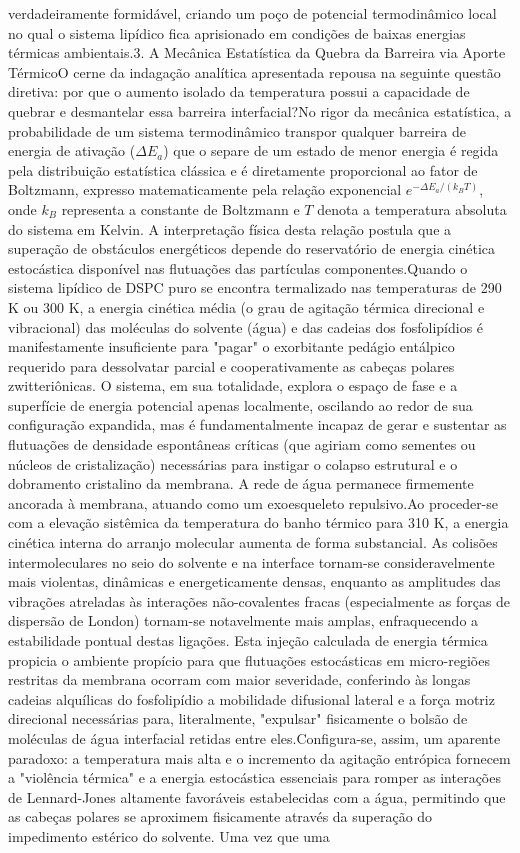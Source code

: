 verdadeiramente formidável, criando um poço de potencial termodinâmico local no qual o sistema lipídico fica aprisionado em condições de baixas energias térmicas ambientais.3. A Mecânica Estatística da Quebra da Barreira via Aporte TérmicoO cerne da indagação analítica apresentada repousa na seguinte questão diretiva: por que o aumento isolado da temperatura possui a capacidade de quebrar e desmantelar essa barreira interfacial?No rigor da mecânica estatística, a probabilidade de um sistema termodinâmico transpor qualquer barreira de energia de ativação ($\Delta E_a$) que o separe de um estado de menor energia é regida pela distribuição estatística clássica e é diretamente proporcional ao fator de Boltzmann, expresso matematicamente pela relação exponencial $e^{-\Delta E_a / (k_B T)}$, onde $k_B$ representa a constante de Boltzmann e $T$ denota a temperatura absoluta do sistema em Kelvin. A interpretação física desta relação postula que a superação de obstáculos energéticos depende do reservatório de energia cinética estocástica disponível nas flutuações das partículas componentes.Quando o sistema lipídico de DSPC puro se encontra termalizado nas temperaturas de 290 K ou 300 K, a energia cinética média (o grau de agitação térmica direcional e vibracional) das moléculas do solvente (água) e das cadeias dos fosfolipídios é manifestamente insuficiente para "pagar" o exorbitante pedágio entálpico requerido para dessolvatar parcial e cooperativamente as cabeças polares zwitteriônicas. O sistema, em sua totalidade, explora o espaço de fase e a superfície de energia potencial apenas localmente, oscilando ao redor de sua configuração expandida, mas é fundamentalmente incapaz de gerar e sustentar as flutuações de densidade espontâneas críticas (que agiriam como sementes ou núcleos de cristalização) necessárias para instigar o colapso estrutural e o dobramento cristalino da membrana. A rede de água permanece firmemente ancorada à membrana, atuando como um exoesqueleto repulsivo.Ao proceder-se com a elevação sistêmica da temperatura do banho térmico para 310 K, a energia cinética interna do arranjo molecular aumenta de forma substancial. As colisões intermoleculares no seio do solvente e na interface tornam-se consideravelmente mais violentas, dinâmicas e energeticamente densas, enquanto as amplitudes das vibrações atreladas às interações não-covalentes fracas (especialmente as forças de dispersão de London) tornam-se notavelmente mais amplas, enfraquecendo a estabilidade pontual destas ligações. Esta injeção calculada de energia térmica propicia o ambiente propício para que flutuações estocásticas em micro-regiões restritas da membrana ocorram com maior severidade, conferindo às longas cadeias alquílicas do fosfolipídio a mobilidade difusional lateral e a força motriz direcional necessárias para, literalmente, "expulsar" fisicamente o bolsão de moléculas de água interfacial retidas entre eles.Configura-se, assim, um aparente paradoxo: a temperatura mais alta e o incremento da agitação entrópica fornecem a "violência térmica" e a energia estocástica essenciais para romper as interações de Lennard-Jones altamente favoráveis estabelecidas com a água, permitindo que as cabeças polares se aproximem fisicamente através da superação do impedimento estérico do solvente. Uma vez que uma 